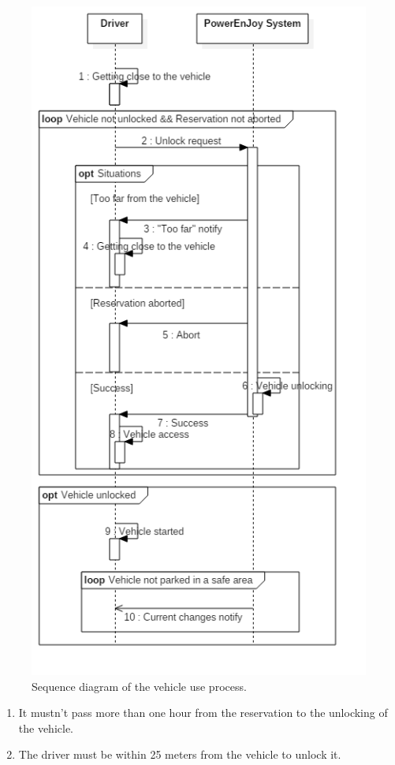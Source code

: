 \begin{figure}[H]
	\begin{center}
		\centering
		\includegraphics[height=0.9\textheight, keepaspectratio]{sequence_diagram/Unlock.png}
		\caption{Sequence diagram of the vehicle use process.}
	\end{center}
\end{figure}


\begin{enumerate}
	\item It mustn't pass more than one hour from the reservation to the 
	unlocking of the vehicle. \label{f-reservationcanc}
	\item The driver must be within 25 meters from the vehicle to unlock it. \label{f-nearby}
\end{enumerate}

